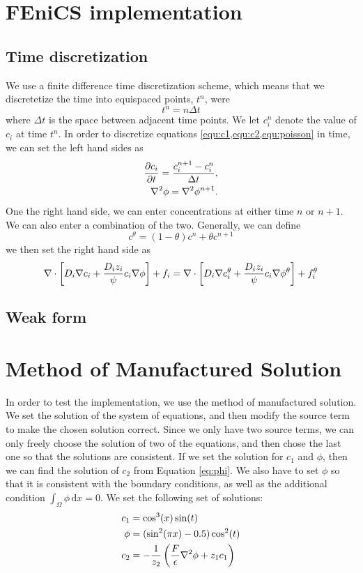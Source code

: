 \documentclass[12pt]{article}
\begin{document}
\section{FEniCS implementation}


\subsection{Time discretization}
We use a finite difference time discretization scheme, which means that we discretetize the time into equispaced points, $t^n$, were 
\begin{equation}
t^n = n\Delta t
\end{equation}
where $\Delta t$ is the space between adjacent time points. We let $c_i^n$ denote the value of $c_i$ at time $t^n$. In order to discretize equations \cref{equ:c1,equ:c2,equ:poisson} in time, we can set the left hand sides as 
\begin{align}
{\partial c_i \over \partial t} = {c_i^{n+1} - c_i^n \over \Delta t}, \\
\nabla^2 \phi = \nabla^2 \phi^{n+1}.
\end{align}
One the right hand side, we can enter concentrations at either time $n$ or $n+1$. We can also enter a combination of the two. Generally, we can define
\begin{equation}
c^\theta = (1-\theta)c^n + \theta c^{n+1}
\end{equation}
we then set the right hand side as 
\begin{equation}
\nabla \cdot \left[ D_i\nabla c_i + {D_iz_i \over \psi} c_i \nabla \phi \right] + f_i = \nabla \cdot \left[ D_i\nabla c_i^\theta + {D_iz_i \over \psi} c_i \nabla \phi^\theta \right] + f_i^\theta
\end{equation}


\subsection{Weak form}

\section{Method of Manufactured Solution}
In order to test the implementation, we use the method of manufactured solution. We set the solution of the system of equations, and then modify the source term to make the chosen solution correct. Since we only have two source terms, we can only freely choose the solution of two of the equations, and then chose the last one so that the solutions are consistent. If we set the solution for $c_1$ and $\phi$, then we can find the solution of $c_2$ from Equation \eqref{eq:phi}. We also have to set $\phi$ so that it is consistent with the boundary conditions, as well as the additional condition $\int_\Omega \phi\, \text{d}x = 0$. We set the following set of solutions:
\begin{align}
c_1 &= \cos^3(x) \sin(t) \\ 
\phi &= (\sin^2(\pi x) - 0.5)\cos^2(t) \\
c_2 & = -{1\over z_2} \left( {F \over \epsilon}\nabla^2\phi + z_1c_1\right)
\end{align}
\end{document}
